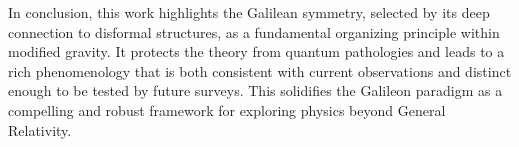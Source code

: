 \documentclass[twocolumn]{aastex631}
\begin{document}
In conclusion, this work highlights the Galilean symmetry, selected by its deep connection to disformal structures, as a fundamental organizing principle within modified gravity. It protects the theory from quantum pathologies and leads to a rich phenomenology that is both consistent with current observations and distinct enough to be tested by future surveys. This solidifies the Galileon paradigm as a compelling and robust framework for exploring physics beyond General Relativity.
\end{document}
